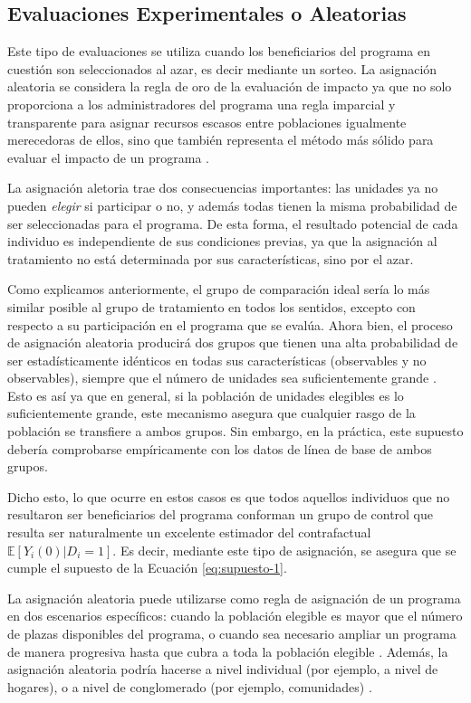 \documentclass[../../main.tex]{subfiles}
\begin{document}
\subsection{Evaluaciones Experimentales o Aleatorias}
Este tipo de evaluaciones se utiliza cuando los beneficiarios del programa en cuestión son
seleccionados al azar, es decir mediante un sorteo. La asignación aleatoria se considera
la regla de oro de la evaluación de impacto ya que no solo proporciona a los
administradores del programa una regla imparcial y transparente para asignar recursos
escasos entre poblaciones igualmente merecedoras de ellos, sino que también representa el
método más sólido para evaluar el impacto de un programa \cite{gertler-2016}.

La asignación aletoria trae dos consecuencias importantes: las unidades ya no pueden
\textit{elegir} si participar o no, y además todas tienen la misma probabilidad de ser
seleccionadas para el programa. De esta forma, el resultado potencial de cada individuo es
independiente de sus condiciones previas, ya que la asignación al tratamiento no está
determinada por sus características, sino por el azar.

Como explicamos anteriormente, el grupo de comparación ideal sería lo más similar posible
al grupo de tratamiento en todos los sentidos, excepto con respecto a su participación en
el programa que se evalúa. Ahora bien, el proceso de asignación aleatoria producirá dos
grupos que tienen una alta probabilidad de ser estadísticamente idénticos en todas sus
características (observables y no observables), siempre que el número de unidades sea
suficientemente grande \cite{gertler-2016}. Esto es así ya que en general, si la población
de unidades elegibles es lo suficientemente grande, este mecanismo asegura que cualquier
rasgo de la población se transfiere a ambos grupos. Sin embargo, en la práctica, este
supuesto debería comprobarse empíricamente con los datos de línea de base de ambos grupos.

Dicho esto, lo que ocurre en estos casos es que todos aquellos individuos que no
resultaron ser beneficiarios del programa conforman un grupo de control que resulta ser
naturalmente un excelente estimador del contrafactual \(\mathbb{E}
\left[Y_i(0)|D_i=1\right]\). Es decir, mediante este tipo de asignación, se asegura que se
cumple el supuesto de la Ecuación \ref{eq:supuesto-1}.

La asignación aleatoria puede utilizarse como regla de asignación de un programa en dos
escenarios específicos: cuando la población elegible es mayor que el número de plazas
disponibles del programa, o  cuando sea necesario ampliar un programa de manera progresiva
hasta que cubra a toda la población elegible \cite{gertler-2016}. Además, la asignación
aleatoria podría hacerse a nivel individual (por ejemplo, a nivel de hogares), o a nivel
de conglomerado (por ejemplo, comunidades) \cite{bernal}.
\end{document}
